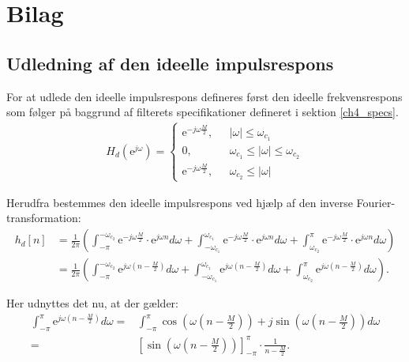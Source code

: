 \chapter{Bilag}\label{app1}
\section{Udledning af den ideelle impulsrespons}
For at udlede den ideelle impulsrespons defineres først den ideelle frekvensrespons som følger på baggrund af filterets specifikationer defineret i sektion \ref{ch4_specs}.
\begin{align*}
 H_d(\text{e}^{j\omega})= \begin{cases}
  \text{e}^{-j\omega\frac{M}{2}}, \ \ \ & |\omega| \leq\omega_{c_1} \\
 0, \ \ \ & \omega_{c_1} \leq |\omega| \leq \omega_{c_2} \\
  \text{e}^{-j\omega\frac{M}{2}}, \ \ \ & \omega_{c_2} \leq |\omega| 
\end{cases}
\end{align*}
  
Herudfra bestemmes den ideelle impulsrespons ved hjælp af den inverse Fourier-transformation:
\begin{align*}
h_d[n] &= \frac{1}{2\pi} \left(  \int_{-\pi}^{-\omega_{c_2}} \text{e}^{-j\omega \frac{M}{2}} \cdot \text{e}^{j \omega n} d\omega + \int_{-\omega_{c_1}}^{\omega_{c_1}} \text{e}^{-j\omega \frac{M}{2}} \cdot \text{e}^{j \omega n} d\omega +\int_{\omega_{c_2}}^{\pi} \text{e}^{-j\omega \frac{M}{2}} \cdot \text{e}^{j \omega n} d\omega	\right) \\
&= \frac{1}{2\pi} \left(  \int_{-\pi}^{-\omega_{c_2}} \text{e}^{j\omega \left(n- \frac{M}{2} \right) } d\omega + \int_{-\omega_{c_1}}^{\omega_{c_1}} \text{e}^{j\omega \left(n- \frac{M}{2} \right) }  d\omega + \int_{\omega_{c_2}}^{\pi} \text{e}^{j\omega \left( n-\frac{M}{2} \right) } d\omega	\right).
\end{align*}

Her udnyttes det nu, at der gælder:
\begin{align*}
\int_{-\pi}^{\pi} \text{e}^{j\omega \left(n- \frac{M}{2} \right) }  d\omega =& \int_{-\pi}^{\pi} \cos\left( \omega \left(n-\frac{M}{2}\right)\right)+j \sin \left( \omega \left(n-\frac{M}{2}\right) \right) d\omega \\
=& \left[ \sin\left(\omega \left(n-\frac{M}{2}\right)\right) \right]_{-\pi}^{\pi} \cdot \frac{1}{n- \frac{M}{2}}.
\end{align*}

